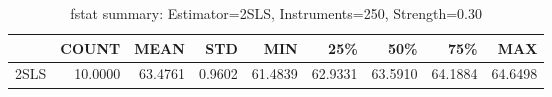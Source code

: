 \begin{table}[ht]
\centering
\caption{fstat summary: Estimator=2SLS, Instruments=250, Strength=0.30}
\begin{tabular}{lrrrrrrrr}
\toprule
 & COUNT & MEAN & STD & MIN & 25\% & 50\% & 75\% & MAX \\
\midrule
2SLS & 10.0000 & 63.4761 & 0.9602 & 61.4839 & 62.9331 & 63.5910 & 64.1884 & 64.6498 \\
\bottomrule
\end{tabular}
\end{table}
